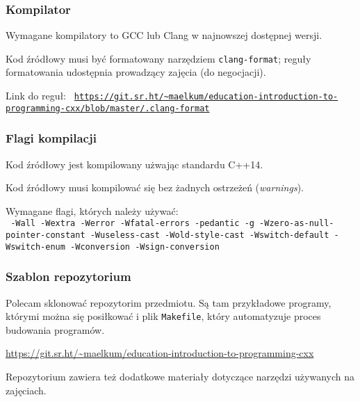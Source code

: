 \documentclass[aspectratio=169]{beamer}
\begin{document}
\begin{frame}
    \frametitle{Kompilator}
    Wymagane kompilatory to GCC lub Clang w najnowszej dostępnej wersji.

    Kod źródłowy musi być formatowany narzędziem {\tt clang-format}; reguły
    formatowania udostępnia prowadzący zajęcia (do negocjacji).

    {\tiny Link do reguł:
    {\tt
    \url{https://git.sr.ht/~maelkum/education-introduction-to-programming-cxx/blob/master/.clang-format}}}
\end{frame}

\begin{frame}
    \frametitle{Flagi kompilacji}

    Kod źródłowy jest kompilowany użwając standardu C++14.

    Kod źródłowy musi kompilować się bez żadnych ostrzeżeń
    (\emph{warnings}).

    \vspace{1em}

    Wymagane flagi, których należy używać:\\
    {\tt
    -Wall -Wextra -Werror -Wfatal-errors -pedantic -g
    -Wzero-as-null-pointer-constant
    -Wuseless-cast
    -Wold-style-cast
    -Wswitch-default
    -Wswitch-enum
    -Wconversion
    -Wsign-conversion
    }
\end{frame}

\begin{frame}
    \frametitle{Szablon repozytorium}

    Polecam sklonować repozytorim przedmiotu. Są tam przykładowe programy,
    którymi można się posiłkować i plik {\tt Makefile}, który automatyzuje
    proces budowania programów.

    \vspace{1em}

    \url{https://git.sr.ht/~maelkum/education-introduction-to-programming-cxx}

    \vspace{2em}

    {\small Repozytorium zawiera też dodatkowe materiały dotyczące narzędzi
    używanych na zajęciach.}
\end{frame}
\end{document}
